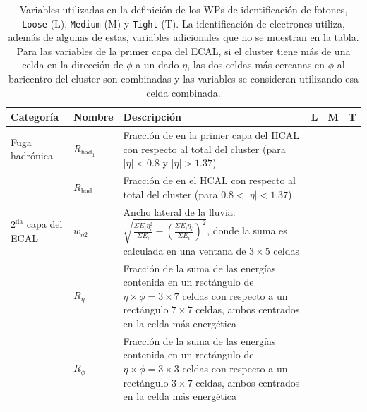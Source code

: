 \begin{table}
\centering 
\caption{Variables utilizadas en la definición de los WPs de identificación de fotones, \texttt{Loose} (L), \texttt{Medium} (M) y \texttt{Tight} (T). La identificación de electrones utiliza, además de algunas de estas, variables adicionales que no se muestran en la tabla. Para las variables de la primer capa del ECAL, si el cluster tiene más de una celda en la dirección de $\phi$ a un dado $\eta$, las dos celdas más cercanas en $\phi$ al baricentro del cluster son combinadas y las variables se consideran utilizando esa celda combinada. }
	\begin{tabular}{ l p{2cm} p{8cm} c c c}

  \hline

  \hline

		Categoría & Nombre & Descripción & L & M & T \\

		\hline
		\hline

		Fuga hadrónica & $R_{\text{had}_{1}}$ & Fracción de \ET en la primer capa del HCAL con respecto al \ET total del cluster (para $|\eta|<0.8$ y $|\eta|>1.37$) & \cmark & \cmark & \cmark\\

		 & $R_{\text{had}}$ & Fracción de \ET en el HCAL con respecto al \ET total del cluster (para $0.8<|\eta|<1.37$) & \cmark & \cmark & \cmark \\

		\hline
		
		$2^{\text{da}}$ capa del ECAL  & $w_{\eta 2}$ & Ancho lateral de la lluvia: $\sqrt{\frac{\Sigma E_{i}\eta_{i}^{2}}{\Sigma E_{i}}-(\frac{\Sigma E_{i}\eta_{i}}{\Sigma E_{i}})^{2}}$, donde la suma es calculada en una ventana de $3\times5$ celdas & \cmark & \cmark & \cmark \\

		 & $R_{\eta}$ & Fracción de la suma de las energías contenida en un rectángulo de $\eta\times\phi = 3\times7$ celdas con respecto a un rectángulo $7\times7$ celdas, ambos centrados en la celda más energética & \cmark & \cmark & \cmark \\

		 & $R_{\phi}$ & Fracción de la suma de las energías contenida en un rectángulo de $\eta\times\phi = 3\times3$ celdas con respecto a un rectángulo $3\times7$ celdas, ambos centrados en la celda más energética & \xmark & \xmark & \cmark \\


\end{tabular}
\end{table}
